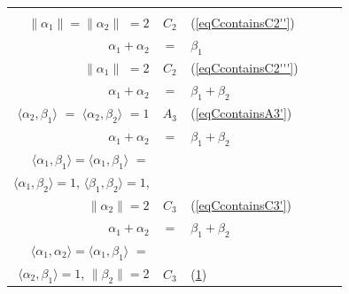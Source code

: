 \documentclass[12pt]{report}
\begin{document}
\begin{longtable}{rcl | c |c c}
\begin{tabular}{l}
$\langle\alpha_1,\beta_1\rangle=\langle\alpha_2,\beta_1\rangle$ $=1$ \\
$\|\alpha_1\|=\|\alpha_2\|$ $=2$
\end{tabular}& 
$C_2$&
{equation} \label{eqCcontainsC2''} (\ref{eqCcontainsC2''}) \\\hline
$\alpha_1+\alpha_2$ &$=$&$\beta_1$&
\begin{tabular}{l}
$\langle\alpha_1,\beta_1\rangle=2$, $\langle\alpha_2,\alpha_1\rangle=-1$ \\
$\|\alpha_1\|$ $=2$
\end{tabular}& 
$C_2$&
{equation} \label{eqCcontainsC2'''} (\ref{eqCcontainsC2'''}) \\\hline
$\alpha_1+\alpha_2$ &$=$&$\beta_1+\beta_2$&
\begin{tabular}{l}
$\langle\alpha_1,\beta_1\rangle$ $=$ $\langle\alpha_1,\beta_2\rangle$ $=$ \\
$\langle\alpha_2,\beta_1\rangle$ $=$ $\langle\alpha_2,\beta_2\rangle$ $=1$ 
\end{tabular}& 
 $A_3$&
 {equation} \label{eqCcontainsA3'} (\ref{eqCcontainsA3'})\\\hline
$\alpha_1+\alpha_2$ &$=$&$\beta_1+\beta_2$&
\begin{tabular}{l}
$\langle\alpha_2,\beta_1\rangle$ $=$ $\langle\alpha_2,\beta_2\rangle$ $=2$,\\
$\langle\alpha_1,\beta_1\rangle=\langle\alpha_1,\beta_1\rangle$ $=$ \\
$\langle\alpha_1,\beta_2\rangle=1$,  $\langle\beta_1,\beta_2\rangle=1$, \\
$\|\alpha_2\|=2$ 
\end{tabular}& 
 $C_3$&
 {equation} \label{eqCcontainsC3'} (\ref{eqCcontainsC3'})\\\hline
$\alpha_1+\alpha_2$ &$=$&$\beta_1+\beta_2$&
\begin{tabular}{l}
$\langle\alpha_1,\beta_2\rangle$ $=$ $\langle\alpha_1,\beta_2\rangle$ $=2$, \\
$\langle\alpha_1,\alpha_2\rangle=\langle\alpha_1,\beta_1\rangle$ $=$ \\
$\langle\alpha_2,\beta_1\rangle=1$, $\|\beta_2\|=2$ 
\end{tabular}& 
 $C_3$&
 {equation} \label{eqCcontainsC3''} (\ref{eqCcontainsC3''})\\\hline
\end{longtable}
\end{document}
